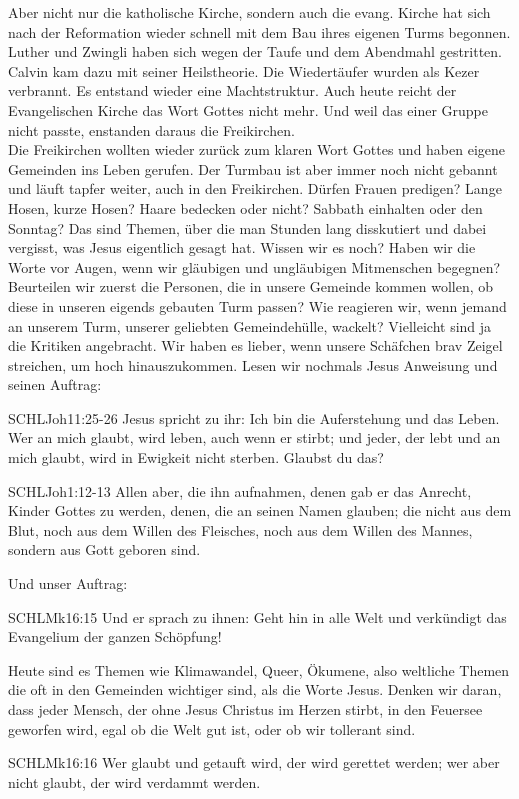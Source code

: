 \documentclass[12pt]{../../inc/mybib}
\newenvironment{block}[1][]{%
  \vspace{1.5em}%
  \noindent\textbf{#1}\par%
  \vspace{0.0em}%
}{%
  \vspace{1em}%
}
\begin{document}
\begin{block}
    Aber nicht nur die katholische Kirche, sondern auch die evang. Kirche hat sich nach der Reformation wieder schnell mit dem Bau ihres eigenen Turms begonnen.
    Luther und Zwingli haben sich wegen der Taufe und dem Abendmahl gestritten. Calvin kam dazu mit seiner Heilstheorie. Die Wiedertäufer wurden als Kezer verbrannt. Es entstand wieder eine Machtstruktur. Auch heute reicht der Evangelischen Kirche das Wort Gottes nicht mehr. Und weil das einer Gruppe nicht passte, enstanden daraus die Freikirchen.\\
    Die Freikirchen wollten wieder zurück zum klaren Wort Gottes und haben eigene Gemeinden ins Leben gerufen. Der Turmbau ist aber immer noch nicht gebannt und läuft tapfer weiter, auch in den Freikirchen. Dürfen Frauen predigen? Lange Hosen, kurze Hosen? Haare bedecken oder nicht? Sabbath einhalten oder den Sonntag? Das sind Themen, über die man Stunden lang disskutiert und dabei vergisst, was Jesus eigentlich gesagt hat. Wissen wir es noch? Haben wir die Worte vor Augen, wenn wir gläubigen und ungläubigen Mitmenschen begegnen? Beurteilen wir zuerst die Personen, die in unsere Gemeinde kommen wollen, ob diese in unseren eigends gebauten Turm passen? Wie reagieren wir, wenn jemand an unserem Turm, unserer geliebten Gemeindehülle, wackelt? Vielleicht sind ja die Kritiken angebracht. Wir haben es lieber, wenn unsere Schäfchen brav Zeigel streichen, um hoch hinauszukommen.
    Lesen wir nochmals Jesus Anweisung und seinen Auftrag:
    \begin{bibelbox}{SCHL}{Joh}{11:25-26}
        Jesus spricht zu ihr: Ich bin die Auferstehung und das Leben. Wer an mich glaubt, wird leben, auch wenn er stirbt; und jeder, der lebt und an mich glaubt, wird in Ewigkeit nicht sterben. Glaubst du das?
    \end{bibelbox} 
    \begin{bibelbox}{SCHL}{Joh}{1:12-13}
        Allen aber, die ihn aufnahmen, denen gab er das Anrecht, Kinder Gottes zu werden, denen, die an seinen Namen glauben;
        die nicht aus dem Blut, noch aus dem Willen des Fleisches, noch aus dem Willen des Mannes, sondern aus Gott geboren sind.
    \end{bibelbox}     
    Und unser Auftrag:
    \begin{bibelbox}{SCHL}{Mk}{16:15}
        Und er sprach zu ihnen: Geht hin in alle Welt und verkündigt das Evangelium der ganzen Schöpfung!
    \end{bibelbox} 
    Heute sind es Themen wie Klimawandel, Queer, Ökumene, also weltliche Themen die oft in den Gemeinden wichtiger sind, als die Worte Jesus. Denken wir daran, dass jeder Mensch, der ohne Jesus Christus im Herzen stirbt, in den Feuersee geworfen wird, egal ob die Welt gut ist, oder ob wir tollerant sind. 
    \begin{bibelbox}{SCHL}{Mk}{16:16}
        Wer glaubt und getauft wird, der wird gerettet werden; wer aber nicht glaubt, der wird verdammt werden.
    \end{bibelbox} 
\end{block}
\end{document}
